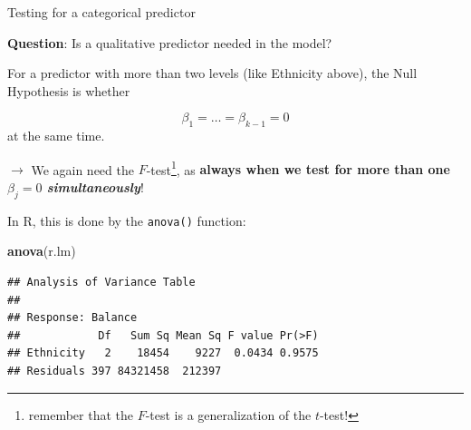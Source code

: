 \documentclass[10pt,ignorenonframetext,]{beamer}
\newenvironment{Shaded}{\begin{snugshade}}{\end{snugshade}}
\newcommand{\KeywordTok}[1]{\textcolor[rgb]{0.13,0.29,0.53}{\textbf{#1}}}
\newcommand{\NormalTok}[1]{#1}
\begin{document}
\begin{frame}[fragile]

\begin{block}{Testing for a categorical predictor}

\vspace{2mm}

\textbf{Question}: Is a qualitative predictor needed in the model?

\vspace{2mm}

For a predictor with more than two levels (like Ethnicity above), the
Null Hypothesis is whether

\[\beta_1 = \ldots = \beta_{k-1}=0\] at the same time.

\vspace{2mm}

\(\rightarrow\) We again need the
\(F\)-test\footnote{remember that the $F$-test is a generalization of the $t$-test!},
as \textbf{always when we test for more than one \(\beta_j=0\)
\emph{simultaneously}}!

\vspace{2mm} In R, this is done by the \texttt{anova()} function:

\scriptsize

\begin{Shaded}
\begin{Highlighting}[]
\KeywordTok{anova}\NormalTok{(r.lm)}
\end{Highlighting}
\end{Shaded}

\begin{verbatim}
## Analysis of Variance Table
## 
## Response: Balance
##            Df   Sum Sq Mean Sq F value Pr(>F)
## Ethnicity   2    18454    9227  0.0434 0.9575
## Residuals 397 84321458  212397
\end{verbatim}

\end{block}

\end{frame}
\end{document}
